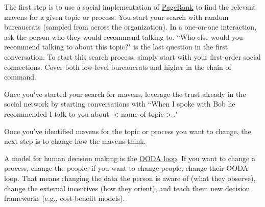The first step is to use a social implementation of \href{https://en.wikipedia.org/wiki/PageRank}{PageRank}
to find the relevant mavens for a given topic or process. You start your search with random bureaucrats (sampled from across the organization). In a one-on-one interaction, ask the person who they would recommend talking to.
``Who else would you recommend talking to about this topic?" is the last question in the first conversation.
To start this search process, simply start with your first-order social connections. Cover both low-level bureaucrats and higher in the chain of command.

Once you've started your search for mavens, leverage the trust already in the social network by starting conversations with ``When I spoke with Bob he recommended I talk to you about $<$name of topic$>$."


Once you've identified mavens for the topic or process you want to change, the next step is to change how the mavens think. 

A model for human decision making is the 
\href{https://en.wikipedia.org/wiki/OODA_loop}{OODA loop}.
If you want to change a process, change the people; if you want to change people, change their OODA loop. That means changing the data the person is aware of (what they observe), change the external incentives (how they orient), and teach them new decision frameworks (e.g., cost-benefit models).



